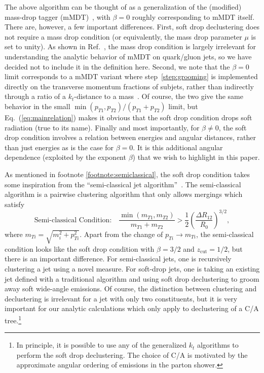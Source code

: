 \documentclass[letterpaper,11pt]{article}
\newcommand{\zcut}{z_\text{cut}}
\DeclareRobustCommand{\Eq}[1]{Eq.~(\ref{#1})}
\DeclareRobustCommand{\Ref}[1]{Ref.~\cite{#1}}
\begin{document}
The above algorithm can be thought of as a generalization of the (modified) mass-drop tagger (mMDT)~\cite{BDRS,taggersRES}, with $\beta = 0$ roughly corresponding to mMDT itself.  There are, however, a few important differences.  First, soft drop declustering does not require a mass drop condition (or equivalently, the mass drop parameter $\mu$ is set to unity).  As shown in \Ref{taggersRES}, the mass drop condition is largely irrelevant for understanding the analytic behavior of mMDT on quark/gluon jets, so we have decided not to include it in the definition here.  Second, we note that the $\beta = 0$ limit corresponds to a mMDT variant where step~\ref{step:grooming} is implemented directly on the transverse momentum fractions of subjets, rather than indirectly through a ratio of a $k_t$-distance to a mass~\cite{taggersRES}.  Of course, the two give the same behavior in the small $\min(p_{T1},p_{T2})/(p_{T1}+p_{T2})$ limit, but \Eq{eq:mainrelation} makes it obvious that the soft drop condition drops soft radiation (true to its name).  Finally and most importantly, for $\beta \not= 0$, the soft drop condition involves a relation between energies and angular distances, rather than just energies as is the case for $\beta = 0$.  It is this additional angular dependence (exploited by the exponent $\beta$) that we wish to highlight in this paper.


As mentioned in footnote \ref{footnote:semiclassical}, the soft drop condition takes some inspiration from the ``semi-classical jet algorithm''~\cite{semi-classical}.  The semi-classical algorithm is a pairwise clustering algorithm that only allows mergings which satisfy
\begin{equation}
\text{Semi-classical Condition:} \quad  \frac{\min(m_{T1},m_{T2})}{m_{T1} + m_{T2}} > \frac{1}{2} \left(\frac{\Delta R_{12}}{R_0}  \right)^{3/2},
\end{equation}
where $m_{Ti} = \sqrt{m_i^2 + p_{Ti}^2}$.  Apart from the change of $p_{Ti} \to m_{Ti}$, the semi-classical condition looks like the soft drop condition with $\beta = 3/2$ and $\zcut = 1/2$, but there is an important difference.  For semi-classical jets, one is recursively clustering a jet using a novel measure.  For soft-drop jets, one is taking an existing jet defined with a traditional algorithm and using soft drop declustering to groom away soft wide-angle emissions.  Of course, the distinction between clustering and declustering is irrelevant for a jet with only two constituents, but it is very important for our analytic calculations which only apply to declustering of a C/A tree.\footnote{In principle, it is possible to use any of the generalized $k_t$ algorithms \cite{Catani:1993hr,Ellis:1993tq} to perform the soft drop declustering. The choice of C/A is motivated by the approximate angular ordering of emissions in the parton shower.}
\end{document}
